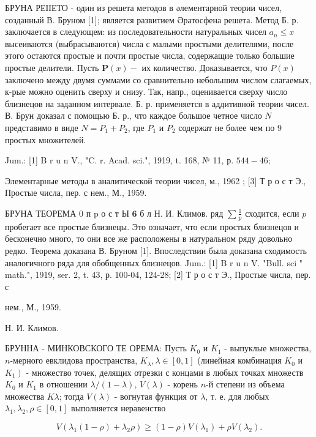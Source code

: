 \documentclass[10pt]{article}
\begin{document}
БРУНА РЕІІЕТО - один из решета методов в әлементарной теории чисел, созданный В. Бруном [1]; является развитием Әратосфена решета. Метод Б. р. заключается в следующем: из последовательности натуральных чисел $a_{n} \leqslant x$ высеиваются (выбрасываются) числа с малыми простыми делителями, после этого остаются простые и почти простые числа, содержащие только большие простые делители. Пусть $\boldsymbol{P}(x)-$ их количество. Доказывается, что $P(x)$ заключено между двумя суммами со сравнительно небольшим числом слагаемых, к-рые можно оценить сверху и снизу. Так, напр., оценивается сверху число близнецов на заданном интервале. Б. р. применяется в аддитивной теории чисел. В. Брун доказал с помощью Б. р., что каждое большое четное число $N$ представимо в виде $N=P_{1}+P_{2}$, где $P_{1}$ и $P_{2}$ содержат не более чем по 9 простых множителей.



Jum.: [1] B r u n V., "C. r. Acad. sci.", 1919, t. 168, № 11, р. $544-46 ;$

Элементарные методы в аналитической теории чисел, м., 1962 ; [3] Т р о с т Э., Простые числа, пер. с нем., М., 1959.



БРУНА ТЕОРЕМА 0 п $\mathrm{p}$ о с т Ы $\mathbf{6}$ б л Н. И. Климов. ряд $\sum \frac{1}{p}$ сходится, если $p$ пробегает все простые близнецы. Это означает, что если простых близнецов и бесконечно много, то они все же расположены в натуральном ряду довольно редко. Теорема доказана В. Бруном [1]. Впоследствии была доказана сходимость аналогичного ряда для обобщенных близнецов. Jum.: [1] B r u n V. "Bull. sci " math.", 1919, ser. 2, t. 43, р. 100-04, 124-28; [2] Т р о с т Э., Простые числа, пер. с

нем., М., 1959.

Н. И. Климов.



БРУННА - МИНКОВСКОГО ТЕ ОРЕМА: Пусть $K_{0}$ и $K_{1}$ - выпуклые множества, $n$-мерного евклидова пространства, $K_{\lambda}, \lambda \in[0,1]$ (линейная комбинация $K_{0}$ и $\left.K_{1}\right)$ - множество точек, делящих отрезки с концами в любых точках множеств $K_{0}$ и $K_{1}$ в отношении $\lambda /(1-\lambda)$, $V(\lambda)$ - корень $n$-й степени из объема множества $K \lambda$; тогда $V(\lambda)$ - вогнутая функция от $\lambda$, т. е. для любых $\lambda_{1}, \lambda_{2}, \rho \in[0,1]$ выполняется неравенство



\[

V\left(\lambda_{1}(1-\rho)+\lambda_{2} \rho\right) \geqslant(1-\rho) V\left(\lambda_{1}\right)+\rho V\left(\lambda_{2}\right) .

\]
\end{document}
